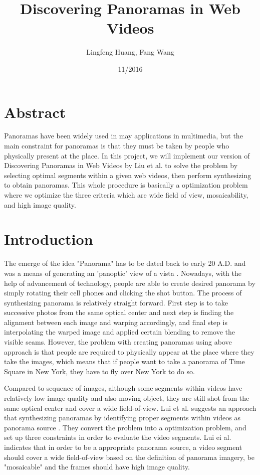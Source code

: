\documentclass[12pt]{article}
\title{Discovering Panoramas in Web Videos}
\author{Lingfeng Huang, Fang Wang}
\date{11/2016}
\begin{document}
\maketitle

\section*{Abstract}
Panoramas have been widely used in may applications in multimedia, but the main constraint for panoramas is that they must be
taken by people who physically present at the place. In this project, we will implement our version of Discovering Panoramas in Web Videos by Liu et al. 
to solve the problem by selecting optimal segments within a given web videos, then perform synthesizing to obtain panoramas. This 
whole procedure is basically a optimization problem where we optimize the three criteria which are wide field of view, mosaicability, and high image 
quality.

\section{Introduction}
The emerge of the idea "Panorama" has to be dated back to early 20 A.D. and was a means of generating an 'panoptic' view of a vista \cite{wikipedia}. Nowadays, 
with the help of advancement of technology, people are able to create desired panorama by simply rotating their cell phones and clicking the shot button. The process
of synthesizing panorama is relatively straight forward. First step is to take successive photos from the same optical center and next step is finding the alignment between
each image and warping accordingly, and final step is interpolating the warped image and applied certain blending to remove the visible seams. However, the problem with creating
panoramas using above approach is that people are required to physically appear at the place where they take the images, which means that if people want to take a panorama
of Time Square in New York, they have to fly over New York to do so. \par
Compared to sequence of images, although some segments within videos have relatively low image quality and also moving object, they are still shot from the same optical center and cover a wide field-of-view. Lui et al. suggests an approach that synthesizing panoramas by identifying proper segments within videos as panorama source \cite{Lui}. They convert the problem into a optimization problem, and set up three constraints in order to evaluate the video segments. Lui ei al. indicates that in order to be a appropriate panorama source, a video segment should cover a wide field-of-view based on the definition of panorama imagery,  be "mosaicable" and the frames should have high image quality\cite{Lui}.
\end{document}

